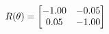 \documentclass[preview]{standalone}
\begin{document}
\begin{align*}
\special{dvisvgm:raw <g id='unique000'>}R(\theta) = \begin{bmatrix}-1.00 & -0.05\\0.05 & -1.00\end{bmatrix}\special{dvisvgm:raw </g>}
\end{align*}
\end{document}
